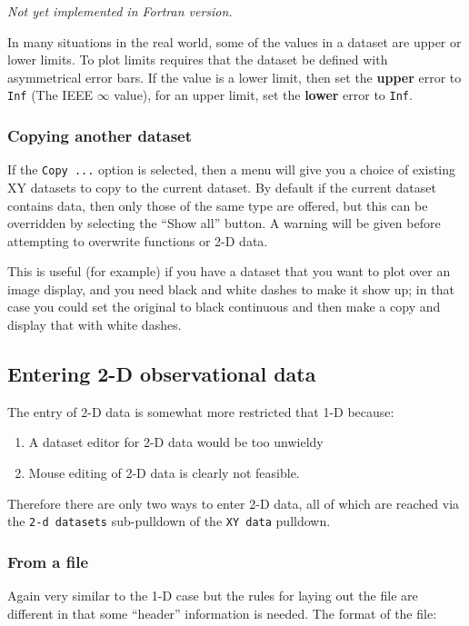\documentclass[11pt,twoside,english]{article}
\begin{document}
\textit{Not yet implemented in Fortran version.}

In many situations in the real world, some of the values in a dataset
are upper or lower limits. To plot limits requires that the dataset be
defined with asymmetrical error bars. If the value is a lower limit,
then set the \textbf{upper} error to \texttt{Inf} (The IEEE
$\infty$ value), for an upper limit, set the \textbf{lower} error to
\texttt{Inf}.

\subsubsection{Copying another dataset}
\label{sec:xycopy}

If the \texttt{Copy ...} option is selected, then a menu will give you
a choice of existing XY datasets to copy to the current dataset. By
default if the current dataset contains data, then only those of the
same type are offered, but this can be overridden by selecting the
``Show all'' button. A warning will be given before attempting to
overwrite functions or 2-D data.

This is useful (for example) if you have a dataset that you want to
plot over an image display, and you need black and white dashes to make
it show up; in that case you could set the original to black continuous
and then make a copy and display that with white dashes.


\subsection{Entering 2-D observational data\label{enter-2d}}

The entry of 2-D data is somewhat more restricted that 1-D because:

\begin{enumerate}
\item A dataset editor for 2-D data would be too unwieldy
\item Mouse editing of 2-D data is clearly not feasible.
\end{enumerate}
Therefore there are only two ways to enter 2-D data, all of which are
reached via the \texttt{2-d datasets} sub-pulldown of the \texttt{XY
  data} pulldown.


\subsubsection{From a file}

Again very similar to the 1-D case but the rules for laying out the
file are different in that some {}``header'' information is needed.
The format of the file:
\end{document}
